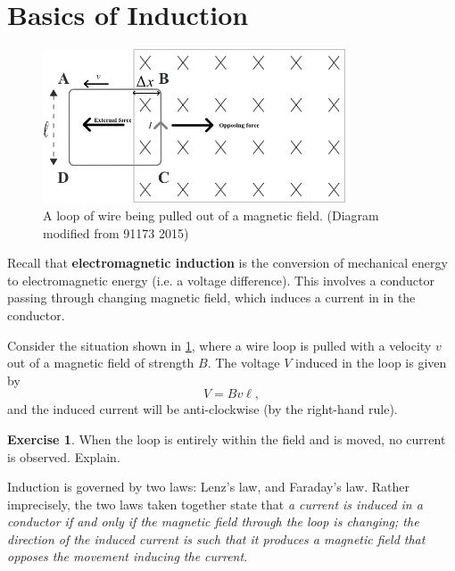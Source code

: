 \documentclass[a4paper]{amsbook}
\theoremstyle{definition}
\newtheorem{exercise}{Exercise}
\numberwithin{exercise}{chapter}
\numberwithin{exercise}{chapter}
\begin{document}
\section{Basics of Induction}
\begin{figure}
  \centering
  \includegraphics[width=0.8\textwidth]{induction3}
  \caption{A loop of wire being pulled out of a magnetic field. (Diagram modified from 91173 2015)\label{fig:induction3}}
\end{figure}
Recall that \textbf{electromagnetic induction} is the conversion of mechanical energy to electromagnetic energy (i.e. a voltage difference). This
involves a conductor passing through changing magnetic field, which induces a current in in the conductor.

Consider the situation shown in \cref{fig:induction3}, where a wire loop is pulled with a velocity $ v $ out of a magnetic field of strength $ B $.
The voltage $ V $ induced in the loop is given by
\begin{equation}
  V = Bv\ell,
\end{equation}
and the induced current will be anti-clockwise (by the right-hand rule).

\begin{exercise}
  When the loop is entirely within the field and is moved, no current is observed. Explain.
\end{exercise}

Induction is governed by two laws: Lenz's law, and Faraday's law. Rather imprecisely, the two laws taken together state
that \textit{a current is induced in a conductor if and only if the magnetic field through the loop is changing; the direction
of the induced current is such that it produces a magnetic field that opposes the movement inducing the current}.
\end{document}
